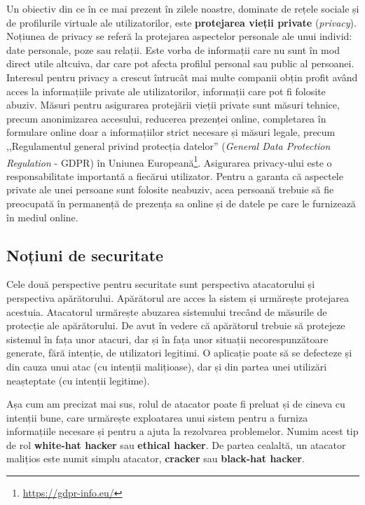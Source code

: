 Un obiectiv din ce în ce mai prezent în zilele noastre, dominate de rețele sociale și de profilurile virtuale ale utilizatorilor, este \textbf{protejarea vieții private} (\textit{privacy}).
Noțiunea de privacy se referă la protejarea aspectelor personale ale unui individ: date personale, poze sau relații.
Este vorba de informații care nu sunt în mod direct utile altcuiva, dar care pot afecta profilul personal sau public al persoanei.
Interesul pentru privacy a crescut întrucât mai multe companii obțin profit având acces la informațiile private ale utilizatorilor, informații care pot fi folosite abuziv.
Măsuri pentru asigurarea protejării vieții private sunt măsuri tehnice, precum anonimizarea accesului, reducerea prezenței online, completarea în formulare online doar a informațiilor strict necesare și măsuri legale, precum ,,Regulamentul general privind protecția datelor'' (\textit{General Data Protection Regulation} - GDPR) în Uniunea Europeană\footnote{\url{https://gdpr-info.eu/}}.
Asigurarea privacy-ului este o responsabilitate importantă a fiecărui utilizator.
Pentru a garanta că aspectele private ale unei persoane sunt folosite neabuziv, acea persoană trebuie să fie preocupată în permanență de prezența sa online și de datele pe care le furnizează în mediul online.

\subsection{Noțiuni de securitate}
\label{sec:sec:fundamentals:notions}

Cele două perspective pentru securitate sunt perspectiva atacatorului și perspectiva apărătorului.
Apărătorul are acces la sistem și urmărește protejarea acestuia.
Atacatorul urmărește abuzarea sistemului trecând de măsurile de protecție ale apărătorului.
De avut în vedere că apărătorul trebuie să protejeze sistemul în fața unor atacuri, dar și în fața unor situații necorespunzătoare generate, fără intenție, de utilizatori legitimi.
O aplicație poate să se defecteze și din cauza unui atac (cu intenții malițioase), dar și din partea unei utilizări neașteptate (cu intenții legitime).

Așa cum am precizat mai sus, rolul de atacator poate fi preluat și de cineva cu intenții bune, care urmărește exploatarea unui sistem pentru a furniza informațiile necesare și pentru a ajuta la rezolvarea problemelor.
Numim acest tip de rol \textbf{white-hat hacker} sau \textbf{ethical hacker}.
De partea cealaltă, un atacator malițios este numit simplu atacator, \textbf{cracker} sau \textbf{black-hat hacker}.


